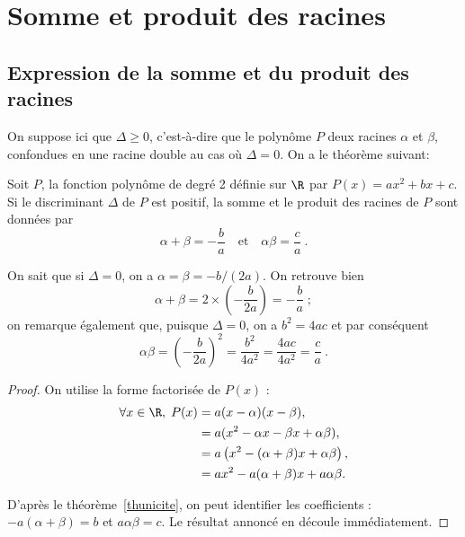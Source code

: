 \section{Somme et produit des racines}
\subsection{Expression de la somme et du produit des racines}
On suppose ici que $\Delta≥0$, c'est-à-dire que le polynôme $P$ deux racines $\alpha$ et $\beta$, confondues en une racine double au cas où $\Delta=0$. On a le théorème suivant:
\begin{thm}\label{thsomprod}%
Soit $P$, la fonction polynôme de degré 2 définie sur $\R$ par $P(x)=ax^2+bx+c$. Si le discriminant $\Delta$ de $P$ est positif, la somme et le produit  des racines de $P$ sont données par
\[
\alpha+\beta=-\frac{b}{a} \quad\text{et}\quad \alpha\beta=\frac{c}{a}\:.
\]
\end{thm}

\begin{remark}
On sait que si $\Delta=0$, on a $\alpha=\beta=-b/(2a)$. On retrouve bien 
\[\alpha+\beta=2\times\left(-\frac{b}{2a}\right)=-\frac{b}{a}\;;\]
on remarque également que, puisque $\Delta=0$, on a $b^2=4ac$ et par conséquent
\[
\alpha\beta=\left(-\frac{b}{2a}\right)^2=\frac{b^2}{4a^2}=\frac{4ac}{4a^2}=\frac{c}{a}\:.
\]
\end{remark}

\begin{proof}On utilise  la forme factorisée de $P(x)$ :
\begin{align*}
\forall x\in\R,\;P(x)&=a(x-\alpha)(x-\beta),\\
&=a(x^2-\alpha x-\beta x +\alpha\beta),\\
&=a\left(x^2-(\alpha+\beta)x+\alpha\beta\right),\\
&=ax^2-a(\alpha+\beta)x +a\alpha\beta.
\end{align*}

D'après le théorème \ref{thunicite}, on peut identifier les coefficients : $-a(\alpha+\beta)=b$ et $a\alpha\beta=c$. Le résultat annoncé en découle immédiatement.
\end{proof}
